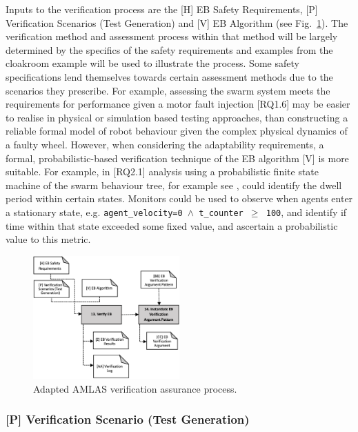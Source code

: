 \documentclass[lettersize,journal]{IEEEtran}
\begin{document}
Inputs to the verification process are the [H] EB Safety Requirements, [P] Verification Scenarios (Test Generation) and [V] EB Algorithm (see Fig.~\ref{amlas-a-stage5}). 
%
The verification method and assessment process within that method will be largely determined by the specifics of the safety requirements and examples from the cloakroom example will be used to illustrate the process. Some safety specifications lend themselves towards certain assessment methods due to the scenarios they prescribe.
%
For example, assessing the swarm system meets the requirements for performance given a motor fault injection [RQ1.6] may be easier to realise in physical or simulation based testing approaches, than constructing a reliable formal model of robot behaviour given the complex physical dynamics of a faulty wheel. 
%
However, when considering the adaptability requirements, a formal, probabilistic-based verification technique of the EB algorithm [V] is more suitable. For example, in [RQ2.1] analysis using a probabilistic finite state machine of the swarm behaviour tree, for example see \cite{Hoffmann2016,Calinescu2018}, could identify the dwell period within certain states. Monitors could be used to observe when agents enter a stationary state, e.g. \texttt{agent\_velocity=0 $\land $  t\_counter  $\ge$ 100}, and identify if time within that state exceeded some fixed value, and ascertain a probabilistic value to this metric.
%
\begin{figure}[!t]
	\centering
	\includegraphics[width=0.5\textwidth]{figures/amlas-a-stage5_v2.png}%
	\caption{Adapted AMLAS verification assurance process.}
	\label{amlas-a-stage5}
\end{figure}


\subsubsection*{[P] Verification Scenario (Test Generation)}
\end{document}
